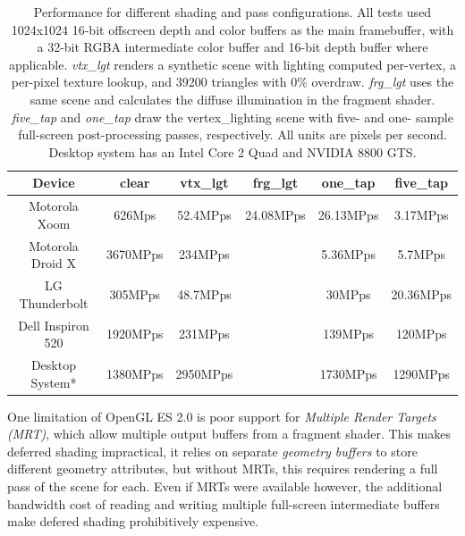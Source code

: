 \begin{table}[htb]\centering \begin{tabular}{|c||c|c|c|c|c|} 
\hline \small{Device} & \small{clear} & \small{vtx\_lgt} & \small{frg\_lgt} & \small{one\_tap} & \small{five\_tap}  \\ \hline 
\hline \small{Motorola Xoom} & \small{626Mps} & \small{52.4MPps}&  \small{24.08MPps} & \small{26.13MPps\footnotemark[1]} & \small{3.17MPps\footnotemark[1]} \\ 
\hline \small{Motorola Droid X} & \small{3670MPps} & \small{234MPps}& & \small{5.36MPps\footnotemark[1]} & \small{5.7MPps\footnotemark[1]} \\ 
\hline \small{LG Thunderbolt} & \small{305MPps} & \small{48.7MPps}& & \small{30MPps} & \small{20.36MPps} \\ 
\hline \small{Dell Inspiron 520} & \small{1920MPps} & \small{231MPps}& & \small{139MPps} & \small{120MPps} \\ 
\hline \small{Desktop System*} & \small{1380MPps} & \small{2950MPps}& & \small{1730MPps} & \small{1290MPps} \\ 
\hline
\end{tabular} 
 \caption{Performance for different shading and pass
configurations.  All tests used 1024x1024 16-bit offscreen depth and color
buffers as the main framebuffer, with a 32-bit RGBA intermediate color buffer
and 16-bit depth buffer where applicable.  \textit{vtx\_lgt} renders a synthetic
scene with lighting computed per-vertex, a per-pixel texture lookup, and 39200
triangles with 0\% overdraw.  \textit{frg\_lgt} uses the same scene and
calculates the diffuse illumination in the fragment shader.
\textit{five\_tap} and \textit{one\_tap} draw the vertex\_lighting
scene with five- and one- sample full-screen post-processing passes,
respectively.  All units are pixels per second.  Desktop system has an Intel
Core 2 Quad and NVIDIA 8800 GTS.}
\label{JonMcCaffrey:pass_performance} \end{table}


One limitation of OpenGL ES 2.0 is poor support for \textit{Multiple Render
Targets (MRT)}, which allow multiple output buffers from a fragment shader.
This makes deferred shading impractical, it relies on separate \textit{geometry
buffers} to store different geometry attributes, but without MRTs, this
requires rendering a full pass of the scene for each.  Even if MRTs
were available however, the additional bandwidth cost of reading and writing
multiple full-screen intermediate buffers make defered shading prohibitively expensive.

